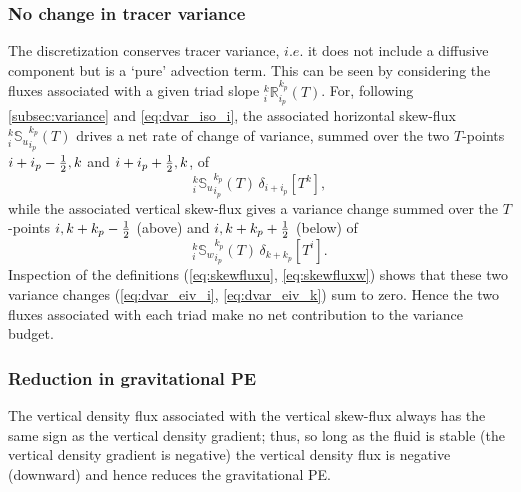 \documentclass[../tex_main/NEMO_manual]{subfiles}
\begin{document}
\subsubsection{No change in tracer variance}
The discretization conserves tracer variance, $i.e.$ it does not include a diffusive component but is a `pure' advection term.
This can be seen %
by considering the fluxes associated with a given triad slope $_i^k{\mathbb{R}}_{i_p}^{k_p} (T)$.
For, following \autoref{subsec:variance} and \autoref{eq:dvar_iso_i},
the associated horizontal skew-flux $_i^k{\mathbb{S}_u}_{i_p}^{k_p} (T)$ drives a net rate of change of variance,
summed over the two $T$-points $i+i_p-\textstyle\frac{1}{2},k$ and $i+i_p+\textstyle\frac{1}{2},k$, of
\begin{equation}
\label{eq:dvar_eiv_i}
  _i^k{\mathbb{S}_u}_{i_p}^{k_p} (T)\,\delta_{i+ i_p}[T^k],
\end{equation}
while the associated vertical skew-flux gives a variance change summed over
the $T$-points $i,k+k_p-\textstyle\frac{1}{2}$ (above) and $i,k+k_p+\textstyle\frac{1}{2}$ (below) of
\begin{equation}
\label{eq:dvar_eiv_k}
  _i^k{\mathbb{S}_w}_{i_p}^{k_p} (T) \,\delta_{k+ k_p}[T^i].
\end{equation}
Inspection of the definitions (\autoref{eq:skewfluxu}, \autoref{eq:skewfluxw}) shows that
these two variance changes (\autoref{eq:dvar_eiv_i}, \autoref{eq:dvar_eiv_k}) sum to zero.
Hence the two fluxes associated with each triad make no net contribution to the variance budget.

\subsubsection{Reduction in gravitational PE}
The vertical density flux associated with the vertical skew-flux always has the same sign as
the vertical density gradient;
thus, so long as the fluid is stable (the vertical density gradient is negative)
the vertical density flux is negative (downward) and hence reduces the gravitational PE.
\end{document}
